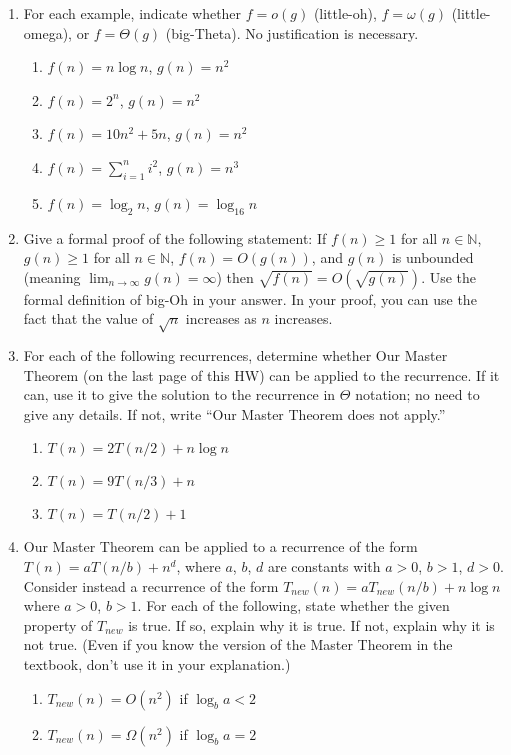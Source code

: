 \documentclass{article}
\begin{document}
\begin{enumerate}
    \item For each example, indicate whether $f = o(g)$ (little-oh), $f = \omega(g)$ (little-omega), or $f = \Theta(g)$ (big-Theta). No justification is necessary.
    \begin{enumerate}
        \item $f(n) = n \log n$, $g(n) = n^2$
        \item $f(n) = 2^n$, $g(n) = n^2$
        \item $f(n) = 10n^2 + 5n$, $g(n) = n^2$
        \item $f(n) = \sum_{i=1}^n i^2$, $g(n) = n^3$
        \item $f(n) = \log_2 n$, $g(n) = \log_{16} n$
    \end{enumerate}

    \item Give a formal proof of the following statement: If $f(n) \ge 1$ for all $n \in \mathbb{N}$, $g(n) \ge 1$ for all $n \in \mathbb{N}$, $f(n) = O(g(n))$, and $g(n)$ is unbounded (meaning $\lim_{n \to \infty} g(n) = \infty$) then $\sqrt{f(n)} = O(\sqrt{g(n)})$. Use the formal definition of big-Oh in your answer. In your proof, you can use the fact that the value of $\sqrt{n}$ increases as $n$ increases.

    \item For each of the following recurrences, determine whether Our Master Theorem (on the last page of this HW) can be applied to the recurrence. If it can, use it to give the solution to the recurrence in $\Theta$ notation; no need to give any details. If not, write “Our Master Theorem does not apply.”
    \begin{enumerate}
        \item $T(n) = 2T(n/2) + n \log n$
        \item $T(n) = 9T(n/3) + n$
        \item $T(n) = T(n/2) + 1$
    \end{enumerate}

    \item Our Master Theorem can be applied to a recurrence of the form $T(n) = aT(n/b) + n^d$, where $a$, $b$, $d$ are constants with $a > 0$, $b > 1$, $d > 0$. Consider instead a recurrence of the form $T_{new}(n) = aT_{new}(n/b) + n \log n$ where $a > 0$, $b > 1$. For each of the following, state whether the given property of $T_{new}$ is true. If so, explain why it is true. If not, explain why it is not true. (Even if you know the version of the Master Theorem in the textbook, don’t use it in your explanation.)
    \begin{enumerate}
        \item $T_{new}(n) = O(n^2)$ if $\log_b a < 2$
        \item $T_{new}(n) = \Omega(n^2)$ if $\log_b a = 2$
    \end{enumerate}


\end{enumerate}
\end{document}

